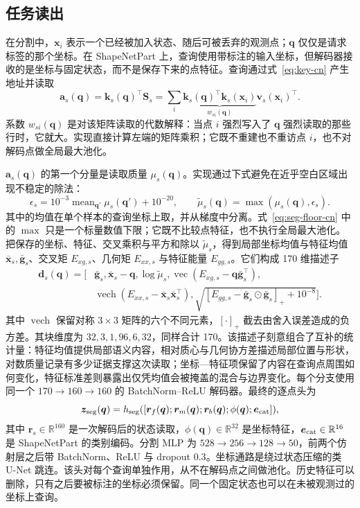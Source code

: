 \documentclass[UTF8,a4paper,11pt,fontset=windows]{ctexart}
\newcommand{\R}{\mathbb{R}}
\newcommand{\Sstate}{\mathbf{S}}
\newcommand{\vect}{\operatorname{vec}}
\begin{document}
\subsection{任务读出}
在分割中，$\bm x_i$ 表示一个已经被加入状态、随后可被丢弃的观测点；$\bm q$ 仅仅是请求标签的那个坐标。在 ShapeNetPart 上，查询使用带标注的输入坐标，但解码器接收的是坐标与固定状态，而不是保存下来的点特征。查询通过式~\eqref{eq:key-cn} 产生地址并读取
\begin{equation}
\bm a_s(\bm q)=\bm k_s(\bm q)^\top\Sstate_s
=\sum_i \underbrace{\bm k_s(\bm q)^\top\bm k_s(\bm x_i)}_{w_{si}(\bm q)}
\bm v_s(\bm x_i)^\top .
\label{eq:effective-read-cn}
\end{equation}
系数 $w_{si}(\bm q)$ 是对该矩阵读取的代数解释：当点 $i$ 强烈写入了 $\bm q$ 强烈读取的那些行时，它就大。实现直接计算左端的矩阵乘积；它既不重建也不重访点 $i$，也不对解码点做全局最大池化。

$\bm a_s(\bm q)$ 的第一个分量是读取质量 $\mu_s(\bm q)$。实现通过下式避免在近乎空白区域出现不稳定的除法：
\begin{equation}
\epsilon_s=10^{-3}\operatorname{mean}_{\bm q'}\mu_s(\bm q')+10^{-20},
\qquad
\widetilde\mu_s(\bm q)=\max(\mu_s(\bm q),\epsilon_s).
\label{eq:seg-floor-cn}
\end{equation}
其中的均值在单个样本的查询坐标上取，并从梯度中分离。式~\eqref{eq:seg-floor-cn} 中的 $\max$ 只是一个标量数值下限；它既不比较点特征，也不执行全局最大池化。把保存的坐标、特征、交叉乘积与平方和除以 $\widetilde\mu_s$，得到局部坐标均值与特征均值 $\bar{\bm x}_s,\bar{\bm g}_s$、交叉矩 $E_{xg,s}$、几何矩 $E_{xx,s}$ 与特征能量 $E_{gg,s}$。它们构成 170 维描述子
\begin{equation}
\begin{aligned}
\bm d_s(\bm q)=[&\bar{\bm g}_s,\bar{\bm x}_s-\bm q,\log\widetilde\mu_s,
\vect(E_{xg,s}-\bm q\bar{\bm g}_s^\top),\\
&\operatorname{vech}(E_{xx,s}-\bar{\bm x}_s\bar{\bm x}_s^\top),
\sqrt{[E_{gg,s}-\bar{\bm g}_s\odot\bar{\bm g}_s]_++10^{-8}}].
\end{aligned}
\label{eq:query-descriptor-cn}
\end{equation}
其中 $\operatorname{vech}$ 保留对称 $3\times3$ 矩阵的六个不同元素，$[\cdot]_+$ 截去由舍入误差造成的负方差。其块维度为 $32,3,1,96,6,32$，同样合计 170。该描述子刻意组合了互补的统计量：特征均值提供局部语义内容，相对质心与几何协方差描述局部位置与形状，对数质量记录有多少证据支撑这次读取；坐标—特征项保留了内容在查询点周围如何变化，特征标准差则暴露出仅凭均值会被掩盖的混合与边界变化。每个分支使用同一个 $170\rightarrow160\rightarrow160$ 的 BatchNorm--ReLU 解码器。最终的逐点头为
\begin{equation}
\bm z_{\rm seg}(\bm q)=h_{\rm seg}([\bm r_f(\bm q);\bm r_m(\bm q);
\bm r_b(\bm q);\phi(\bm q);\bm e_{\rm cat}]),
\label{eq:seg-cn}
\end{equation}
其中 $\bm r_s\in\R^{160}$ 是一次解码后的状态读取，$\phi(\bm q)\in\R^{32}$ 是坐标特征，$\bm e_{\rm cat}\in\R^{16}$ 是 ShapeNetPart 的类别编码。分割 MLP 为 $528\rightarrow256\rightarrow128\rightarrow50$，前两个仿射层之后带 BatchNorm、ReLU 与 dropout $0.3$。坐标通路是绕过状态压缩的类 U-Net 跳连。该头对每个查询单独作用，从不在解码点之间做池化。历史特征可以删除，只有之后要被标注的坐标必须保留。同一个固定状态也可以在未被观测过的坐标上查询。
\end{document}
